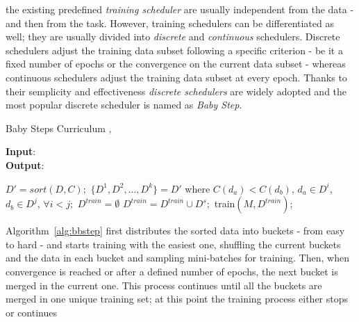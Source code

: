 the existing predefined \textit{training scheduler} are usually independent from the data - and then from the task.
However, training schedulers can be differentiated as well; they are usually divided into \textit{discrete} and \textit{continuous} schedulers.
Discrete schedulers adjust the training data subset following a specific criterion - 
be it a fixed number of epochs or the convergence on the current data subset - whereas continuous schedulers adjust 
the training data subset at every epoch.
Thanks to their semplicity and effectiveness \textit{discrete schedulers} are widely adopted and the most popular
discrete scheduler is named as \textit{Baby Step}. 
\begin{algorithm}
    \caption{Baby Steps Curriculum \cite{cirik2016visualizing}, \cite{wang2021survey}}\label{alg:bbstep}
    \hspace*{\algorithmicindent} \textbf{Input}: \\
    \hspace*{\algorithmicindent} \textbf{Output}: 
    \begin{algorithmic}[1]
    \State $D'= sort(D,C);$
    \State $\lbrace D^1, D^2,...,D^k \rbrace = D'$ where $C(d_a) < C(d_b)$, $d_a\in D^i$, $d_b\in D^j$, $\forall i<j;$
    \State $D^{train} = \emptyset$
        \State $D^{train} = D^{train} \cup D^s;$
        \State train$(M, D^{train});$
        \EndWhile
    \EndFor
    \end{algorithmic}
\end{algorithm}
\newline
Algorithm~\ref{alg:bbstep} first distributes the sorted data into buckets - from easy to hard - and starts training with the easiest one, 
shuffling the current buckets and the data in each bucket and sampling mini-batches for training.
Then, when convergence is reached or after a defined number of epochs, the next bucket is merged in the current one. 
This process continues until all the buckets are merged in one unique training set; at this point the training process either stops or continues 
